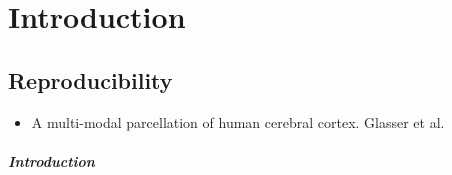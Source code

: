 \chapter{Introduction}
\section{Reproducibility}
\begin{itemize}
 \item A multi-modal parcellation of human cerebral cortex. Glasser et al.
\end{itemize}
\paragraph{Introduction}
